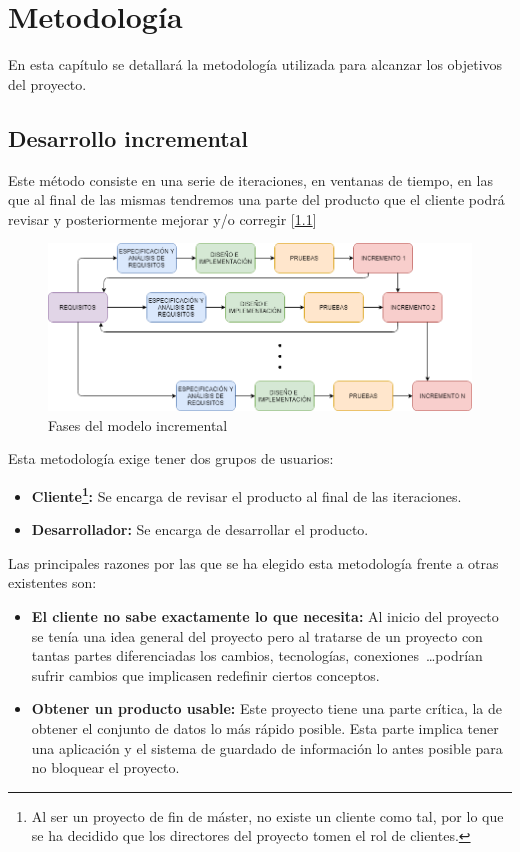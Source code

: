 \chapter{Metodología}
\label{sec:metodologia}

En esta capítulo se detallará la metodología utilizada para alcanzar los objetivos del proyecto.

\section{Desarrollo incremental}
Este método consiste en una serie de iteraciones, en ventanas de tiempo, en las que al final de las mismas tendremos una parte del producto que el cliente podrá revisar y posteriormente mejorar y/o corregir [\cref{fig:metologia}]

\begin{figure}[htbp!]
    \centering
    \includegraphics[width=\textwidth, keepaspectratio]{images/arquitectura/metodologia.png}
    \caption{Fases del modelo incremental}
    \label{fig:metologia}
\end{figure}

Esta metodología exige tener dos grupos de usuarios:

\begin{itemize}[noitemsep]
    \item \textbf{Cliente\footnote{Al ser un proyecto de fin de máster, no existe un cliente como tal, por lo que se ha decidido que los directores del proyecto tomen el rol de clientes.}:} Se encarga de revisar el producto al final de las iteraciones.
    \item \textbf{Desarrollador:} Se encarga de desarrollar el producto.
\end{itemize}


Las principales razones por las que se ha elegido esta metodología frente a otras existentes son:

\begin{itemize}[noitemsep]
    \item \textbf{El cliente no sabe exactamente lo que necesita:} Al inicio del proyecto se tenía una idea general del proyecto pero al tratarse de un proyecto con tantas partes diferenciadas los cambios, tecnologías, conexiones~\dots podrían sufrir cambios que implicasen redefinir ciertos conceptos.

    \item \textbf{Obtener un producto usable:} Este proyecto tiene una parte crítica, la de obtener el conjunto de datos lo más rápido posible. Esta parte implica tener una aplicación y el sistema de guardado de información lo antes posible para no bloquear el proyecto.
\end{itemize}

